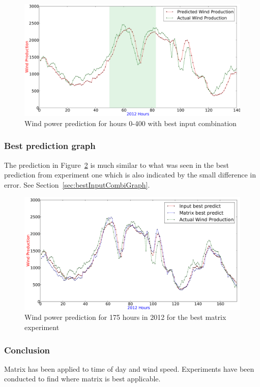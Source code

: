 \begin{figure}[H]
\centering
\includegraphics[width=0.99\linewidth]{billeder/bestInputPredictFrom0-400.png}
\caption{Wind power prediction for hours 0-400 with best input combination}
\label{fig:bestInputPredictFrom0-400}
\end{figure} 

\subsubsection{Best prediction graph}
The prediction in Figure~\ref{fig:bestMatrixGraph} is much similar to what was seen in the best prediction from experiment one which is also indicated by the small difference in error. See Section~\ref{sec:bestInputCombiGraph}. 

\begin{figure}[H]
\centering
\includegraphics[width=0.99\linewidth]{billeder/bestMatrixGraph.png}
\caption{Wind power prediction for 175 hours in 2012 for the best matrix experiment}
\label{fig:bestMatrixGraph}
\end{figure}   

\subsubsection{Conclusion}
Matrix has been applied to time of day and wind speed. Experiments have been conducted to find where matrix is best applicable.

